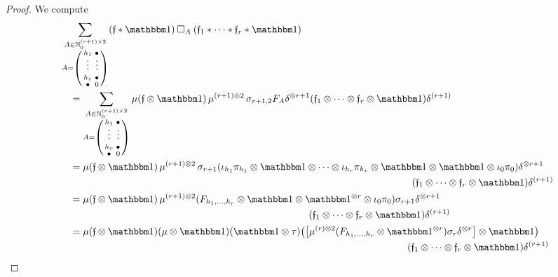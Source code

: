 \documentclass[\MainFolder/Text.tex]{subfiles}
\begin{document}
\begin{proof}
We compute
\begin{align*}
& \sum_{\substack{A \in \N_0^{(r+1)\times 2} \\ A = \left(\begin{smallmatrix}
h_1 & \bullet \\
\vphantom{\int\limits^x}\smash{\vdots} & \smash{\vdots} \\
h_r & \bullet \\ 
\bullet & 0
\end{smallmatrix}\right)}} (\MVMorF\Star\Id)\SquareComp_A (\MVMorF_1\Star\dotsb\Star\MVMorF_r \Star \Id) \\
&\quad =\sum_{\substack{A \in \N_0^{(r+1)\times 2} \\ A = \left(\begin{smallmatrix}
h_1 & \bullet \\
\vphantom{\int\limits^x}\smash{\vdots} & \smash{\vdots} \\
h_r & \bullet \\ 
\bullet & 0
\end{smallmatrix}\right)}} \MVProd(\MVMorF \otimes \Id)\Prod^{(r+1)\otimes 2}\sigma_{r+1,2}F_A\MVCoProd^{\otimes r+1}(\MVMorF_1 \otimes \dotsb \otimes \MVMorF_{r}\otimes\Id)\MVCoProd^{(r+1)} \\
&\quad = \begin{multlined}[t]\MVProd(\MVMorF \otimes \Id)\Prod^{(r+1)\otimes 2}\sigma_{r+1}(\iota_{h_1}\pi_{h_1}\otimes \Id \otimes\dotsb \otimes\iota_{h_r}\pi_{h_r}\otimes \Id\otimes  \Id \otimes \iota_0\pi_0)\MVCoProd^{\otimes r+1} \\ (\MVMorF_1 \otimes \dotsb \otimes \MVMorF_{r}\otimes\Id)\MVCoProd^{(r+1)}\end{multlined}\\
&\quad = \begin{multlined}[t]\MVProd(\MVMorF \otimes \Id)\Prod^{(r+1)\otimes 2}(F_{h_1,\dotsc,h_r}\otimes \Id\otimes  \Id^{\otimes r} \otimes \iota_0\pi_0)\sigma_{r+1} \MVCoProd^{\otimes r+1} \\ (\MVMorF_1 \otimes \dotsb \otimes \MVMorF_{r}\otimes\Id)\MVCoProd^{(r+1)}\end{multlined} \\
&\quad =\begin{multlined}[t]\MVProd(\MVMorF\otimes \Id)(\MVProd\otimes\Id)(\Id\otimes \tau)\bigl(\bigl[\MVProd^{(r)\otimes 2}(F_{h_1,\dotsc,h_r} \otimes \Id^{\otimes r})\sigma_r\MVCoProd^{\otimes r}\bigr] \otimes \Id \bigr)\\(\MVMorF_1\otimes \dotsb \otimes \MVMorF_r\otimes \Id)\MVCoProd^{(r+1)}\end{multlined} \\

\end{align*}
\end{proof}
\end{document}
